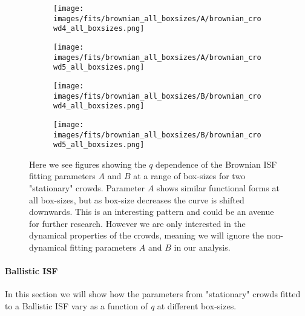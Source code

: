 \documentclass[10pt]{article}
\begin{document}
\begin{figure}[H]
\begin{subfigure}[t]{.5\textwidth}
  \centering
 \texttt{[image: images/fits/brownian\_all\_boxsizes/A/brownian\_crowd4\_all\_boxsizes.png]}
  \caption{}
\end{subfigure}%
\hfill
\begin{subfigure}[t]{.5\textwidth}
  \centering
  \texttt{[image: images/fits/brownian\_all\_boxsizes/A/brownian\_crowd5\_all\_boxsizes.png]}
  \caption{}
\end{subfigure}
\label{fig:crowd_brownian_fits_A_all_boxsizes}
\par\bigskip
\begin{subfigure}[t]{.5\textwidth}
  \centering
 \texttt{[image: images/fits/brownian\_all\_boxsizes/B/brownian\_crowd4\_all\_boxsizes.png]}
  \caption{}
\end{subfigure}%
\hfill
\begin{subfigure}[t]{.5\textwidth}
  \centering
  \texttt{[image: images/fits/brownian\_all\_boxsizes/B/brownian\_crowd5\_all\_boxsizes.png]}
  \caption{}
\end{subfigure}
\caption{Here we see figures showing the $q$ dependence of the Brownian ISF fitting parameters $A$ and $B$ at a range of box-sizes for two "stationary" crowds. Parameter $A$ shows similar functional forms at all box-sizes, but as box-size decreases the curve is shifted downwards. This is an interesting pattern and could be an avenue for further research. However we are only interested in the dynamical properties of the crowds, meaning we will ignore the non-dynamical fitting parameters $A$ and $B$ in our analysis.}
\label{fig:crowd_brownian_fits_tauc_B_boxsizes}
\end{figure}


\paragraph{Ballistic ISF} In this section we will show how the parameters from "stationary" crowds fitted to a Ballistic ISF vary as a function of \textit{q} at different box-sizes. 
\end{document}
